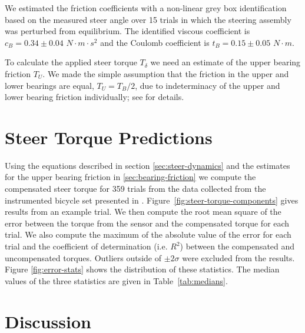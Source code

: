 \documentclass[10pt]{article}
\begin{document}
We estimated the friction coefficients with a non-linear grey box
identification based on the measured steer angle over 15 trials in which the
steering assembly was perturbed from equilibrium. The identified viscous
coefficient is $c_B = 0.34 \pm 0.04$ $N \cdot m \cdot s^2$ and the Coulomb
coefficient is $t_B = 0.15 \pm 0.05$ $N \cdot m$.

To calculate the applied steer torque $T_\delta$ we need an estimate of the
upper bearing friction $T_U$. We made the simple assumption that the friction
in the upper and lower bearings are equal, $T_U = T_B / 2$, due to
indeterminacy of the upper and lower bearing friction individually; see
\cite{Moore2012} for details.

\section*{Steer Torque Predictions}

Using the equations described in section \ref{sec:steer-dynamics} and the
estimates for the upper bearing friction in \ref{sec:bearing-friction} we
compute the compensated steer torque for 359 trials from the data collected
from the instrumented bicycle set presented in \cite{Moore2012}.
Figure~\ref{fig:steer-torque-components} gives results from an example trial.
We then compute the root mean square of the error between the torque from the
sensor and the compensated torque for each trial. We also compute the maximum
of the absolute value of the error for each trial and the coefficient of
determination (i.e. $R^2$) between the compensated and uncompensated torques.
Outliers outside of $\pm2 \sigma$ were excluded from the results. Figure
\ref{fig:error-stats} shows the distribution of these statistics. The median
values of the three statistics are given in Table~\ref{tab:medians}.

\section*{Discussion}
\end{document}
